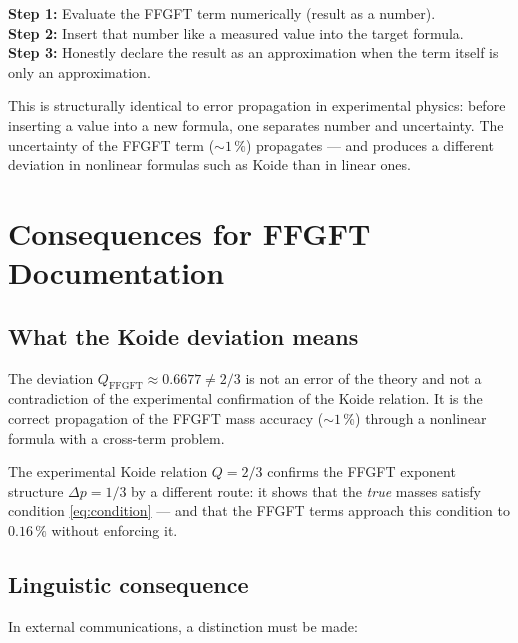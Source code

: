 \begin{keyresult}
\textbf{Step 1:} Evaluate the FFGFT term numerically (result as a number).\\
\textbf{Step 2:} Insert that number like a measured value into the target formula.\\
\textbf{Step 3:} Honestly declare the result as an approximation
  when the term itself is only an approximation.
\end{keyresult}

This is structurally identical to error propagation in experimental physics:
before inserting a value into a new formula, one separates number and uncertainty.
The uncertainty of the FFGFT term ($\sim 1\,\%$) propagates — and produces
a different deviation in nonlinear formulas such as Koide than in linear ones.

\section{Consequences for FFGFT Documentation}

\subsection{What the Koide deviation means}

The deviation $Q_{\text{FFGFT}} \approx 0{.}6677 \neq 2/3$ is not an error
of the theory and not a contradiction of the experimental confirmation of
the Koide relation. It is the correct propagation of the FFGFT mass accuracy
($\sim 1\,\%$) through a nonlinear formula with a cross-term problem.

The experimental Koide relation $Q = 2/3$ confirms the FFGFT exponent
structure $\Delta p = 1/3$ by a different route: it shows that the
\emph{true} masses satisfy condition \eqref{eq:condition} — and that the
FFGFT terms approach this condition to $0{.}16\,\%$
without enforcing it.

\subsection{Linguistic consequence}

In external communications, a distinction must be made:

